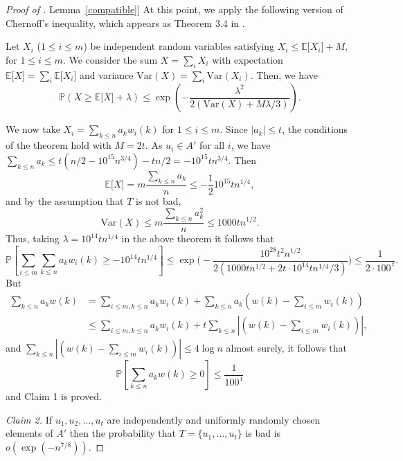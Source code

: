 \documentclass[11pt]{article}
\numberwithin{equation}{section}
\theoremstyle{definition}
\theoremstyle{plain}
\newcommand{\expref}[2]{\hyperref[#2]{#1~\ref{#2}}}
\newcommand\E{\mathbb{E}}
\renewcommand\P{\mathbb{P}}
\begin{document}
\begin{proof}[Proof of \expref{Lemma}{compatible}]
  At this point, we apply the following version of Chernoff's inequality, which appears as Theorem 3.4 in \cite{chunglu}.
  
  \smallskip
  
  Let $X_i$ ($1 \leq i \leq m$) be independent random variables
  satisfying $X_i \leq \E \lbrack X_i\rbrack + M$, for
  $1 \leq i \leq m$. We consider the sum $X=\sum_i X_i$ with
  expectation $\E\lbrack X\rbrack = \sum_i \E\lbrack X_i\rbrack$ and
  variance $\text{Var}(X) = \sum_i \text{Var}(X_i)$. Then, we have
  \[
    \P( X \geq \E\lbrack X\rbrack + \lambda) \leq
    \exp\left(-\frac{\lambda^2}{2(\text{Var}(X)+M\lambda/3)}\right).
  \]
  
  \smallskip
  
  We now take $X_i=\sum_{k\leq n} a_kw_i(k)$ for $1\leq i\leq
  m$. Since $|a_k|\leq t$, the conditions of the theorem hold with
  $M=2t$. As $u_i\in A'$ for all $i$, we have
  $\sum_{k\leq n} a_k\leq
  t(n/2-10^{15}n^{3/4})-tn/2=-10^{15}tn^{3/4}$. Then
  \[
    \E\lbrack X\rbrack=m\frac{\sum_{k\leq n} a_k}{n} \leq
    -\frac{1}{2}10^{15}tn^{1/4},
  \]
  and by the assumption that $T$ is not bad,
  \[
    \text{Var}(X)\leq m \frac{\sum_{k\leq n} a_k^2}{n}\leq
    1000tn^{1/2}.
  \]
  Thus, taking $\lambda=10^{14}tn^{1/4}$ in the above theorem it
  follows that
  \[
    \P\left\lbrack \sum_{i\leq m}\sum_{k\leq n} a_kw_i(k)\geq
  -10^{14}tn^{1/4}\right\rbrack \leq
  \exp\bigg(-\frac{10^{28}t^2n^{1/2}}{2(1000tn^{1/2}+2t\cdot10^{14}tn^{1/4}/3)}\bigg)\leq
  \frac{1}{2\cdot 100^{\,t}}.
\]
But
	\begin{align*}
	\sum_{k\leq n}a_kw(k) &= \sum_{i\leq m,k\leq n}a_kw_i(k)+\sum_{k\leq n}a_k(w(k)-\sum_{i\leq m}w_i(k)) \\
	&\leq \sum_{i\leq m,k\leq n}a_kw_i(k)+t\sum_{k\leq n}\left|(w(k)-\sum_{i\leq m}w_i(k))\right|,
	\end{align*} and $\sum_{k\leq n}|(w(k)-\sum_{i\leq m}w_i(k))|\leq 4\log n$ almost surely, it follows that
        \[
   \mathbb{P} \left\lbrack\sum_{k\leq n}a_kw(k)\geq 0 \right\rbrack\leq \frac{1}{100^{\,t}}
        \]
        and Claim 1 is proved.
	
	\smallskip
	
	\noindent \emph{Claim 2.} If $u_1,u_2,\dots,u_t$ are independently and uniformly randomly chosen elements of $A'$ then the probability that $T=\{u_1,\dots,u_t\}$ is bad is $o(\exp(-n^{7/8}))$.
	
	\smallskip
	

\end{proof}
\end{document}
